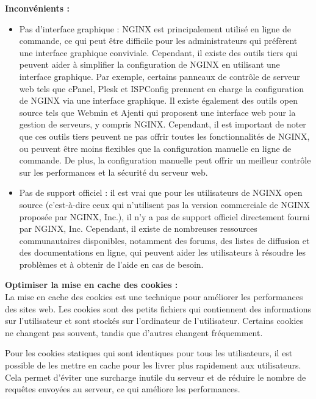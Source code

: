 \documentclass{article}
\begin{document}
{\bf Inconvénients :}\\
\begin{itemize}
    \item Pas d'interface graphique : NGINX est principalement utilisé en ligne de commande, ce qui peut être difficile pour les administrateurs qui préfèrent une interface graphique conviviale.
    Cependant, il existe des outils tiers qui peuvent aider à simplifier la configuration de NGINX en utilisant une interface graphique. Par exemple, certains panneaux de contrôle de serveur web tels que cPanel, Plesk et ISPConfig prennent en charge la configuration de NGINX via une interface graphique. Il existe également des outils open source tels que Webmin et Ajenti qui proposent une interface web pour la gestion de serveurs, y compris NGINX. Cependant, il est important de noter que ces outils tiers peuvent ne pas offrir toutes les fonctionnalités de NGINX, ou peuvent être moins flexibles que la configuration manuelle en ligne de commande. De plus, la configuration manuelle peut offrir un meilleur contrôle sur les performances et la sécurité du serveur web.\\

    \item Pas de support officiel : il est vrai que pour les utilisateurs de NGINX open source (c'est-à-dire ceux qui n'utilisent pas la version commerciale de NGINX proposée par NGINX, Inc.), il n'y a pas de support officiel directement fourni par NGINX, Inc. Cependant, il existe de nombreuses ressources communautaires disponibles, notamment des forums, des listes de diffusion et des documentations en ligne, qui peuvent aider les utilisateurs à résoudre les problèmes et à obtenir de l'aide en cas de besoin.\\ 
\end{itemize}

\hspace{0.1cm}

{\bf Optimiser la mise en cache des cookies :}\\

La mise en cache des cookies est une technique pour améliorer les performances des sites web. Les cookies sont des petits fichiers qui contiennent des informations sur l'utilisateur et sont stockés sur l'ordinateur de l'utilisateur. Certains cookies ne changent pas souvent, tandis que d'autres changent fréquemment.

Pour les cookies statiques qui sont identiques pour tous les utilisateurs, il est possible de les mettre en cache pour les livrer plus rapidement aux utilisateurs. Cela permet d'éviter une surcharge inutile du serveur et de réduire le nombre de requêtes envoyées au serveur, ce qui améliore les performances.
\end{document}
